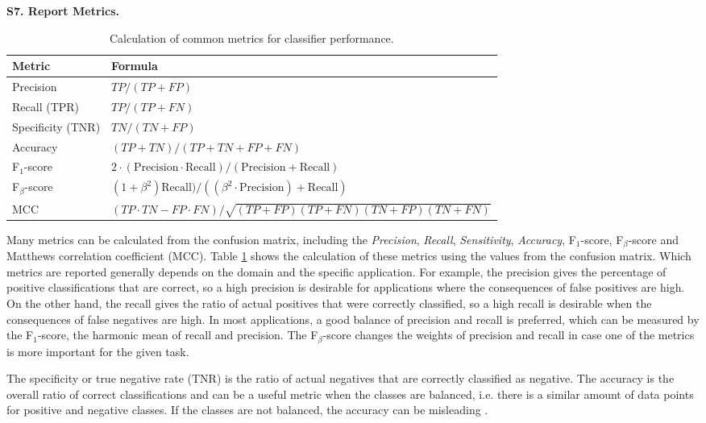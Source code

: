 \documentclass[a4paper]{article}
\begin{document}
\textbf{S7. Report Metrics.}\\
\begin{table}[bh]
	\centering
	\caption{Calculation of common metrics for classifier performance.}
	\label{table:metrics}
	\begin{tabularx}{\textwidth}{|p{3cm}|X|}
		\hline
		\textbf{Metric} & \textbf{Formula} \\
		\hline
		Precision & $TP / (TP + FP)$ \\
		Recall (TPR) & $TP / (TP + FN)$ \\
		Specificity (TNR) & $TN / (TN + FP)$ \\
		Accuracy & $(TP + TN) / (TP + TN + FP + FN)$ \\
		F$_1$-score & $2 \cdot (\text{Precision} \cdot \text{Recall})/(\text{Precision} + \text{Recall})$ \\
		F$_\beta$-score & $(1 + \beta^2)\text{Recall})/((\beta^2\cdot\text{Precision}) + \text{Recall})$ \\
		MCC & $(TP \cdot TN - FP \cdot FN) / \sqrt{(TP + FP)(TP + FN)(TN + FP)(TN + FN)}$ \\
		\hline
	\end{tabularx}
\end{table}
Many metrics can be calculated from the confusion matrix, including the \textit{Precision}, \textit{Recall}, \textit{Sensitivity}, \textit{Accuracy}, F$_1$-score, F$_\beta$-score and Matthews correlation coefficient (MCC). Table \ref{table:metrics} shows the calculation of these metrics using the values from the confusion matrix. Which metrics are reported generally depends on the domain and the specific application. For example, the precision gives the percentage of positive classifications that are correct, so a high precision is desirable for applications where the consequences of false positives are high. On the other hand, the recall gives the ratio of actual positives that were correctly classified, so a high recall is desirable when the consequences of false negatives are high. In most applications, a good balance of precision and recall is preferred, which can be measured by the F$_1$-score, the harmonic mean of recall and precision. The F$_\beta$-score changes the weights of precision and recall in case one of the metrics is more important for the given task.

The specificity or true negative rate (TNR) is the ratio of actual negatives that are correctly classified as negative. The accuracy is the overall ratio of correct classifications and can be a useful metric when the classes are balanced, i.e. there is a similar amount of data points for positive and negative classes. If the classes are not balanced, the accuracy can be misleading \cite{Lones2024pitfalls, Haixiang2017imbalance}.
\end{document}
